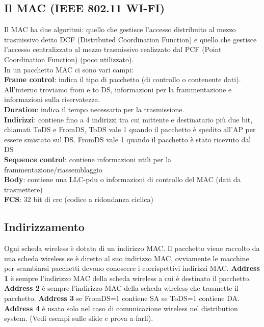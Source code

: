 \documentclass{article}
\begin{document}
\subsection{Il MAC (IEEE 802.11 WI-FI)}
Il MAC ha due algoritmi: quello che gestisce l’accesso distribuito al mezzo trasmissivo detto DCF (Distributed Coordination Function) e quello che gestisce l’accesso centralizzato al mezzo trasmissivo realizzato dal PCF (Point Coordination Function) (poco utilizzato).\\
In un pacchetto MAC ci sono vari campi:\\
\textbf{Frame control}: indica il tipo di pacchetto (di controllo o contenente dati). All'interno troviamo from e to DS, informazioni per la frammentazione e informazioni sulla riservatezza.\\
\textbf{Duration}: indica il tempo necessario per la trasmissione.\\
\textbf{Indirizzi}: contiene fino a 4 indirizzi tra cui mittente e destinatario più due bit, chiamati ToDS e FromDS, ToDS vale 1 quando il pacchetto è spedito all’AP per essere smistato sul DS. FromDS vale 1 quando il pacchetto è stato ricevuto dal DS\\
\textbf{Sequence control}: contiene informazioni utili per la frammentazione/riassemblaggio\\
\textbf{Body}: contiene una LLC-pdu o informazioni di controllo del MAC (dati da trasmettere)\\
\textbf{FCS}: 32 bit di crc (codice a ridondanza ciclica)
\subsection{Indirizzamento}
Ogni scheda wireless è dotata di un indirizzo MAC. Il pacchetto viene raccolto da una scheda wireless se è diretto al suo indirizzo MAC, ovviamente le macchine per scambiarsi pacchetti devono conoscere i corrispettivi indirizzi MAC. \textbf{Address 1} è sempre l’indirizzo MAC della scheda wireless a cui è destinato il pacchetto. \textbf{Address 2} è sempre l’indirizzo MAC della scheda wireless che trasmette il pacchetto. \textbf{Address 3} se FromDS=1 contiene SA se ToDS=1 contiene DA. \textbf{Address 4} è usato solo nel caso di comunicazione wireless nel distribution system. (Vedi esempi sulle slide e prova a farli).
\end{document}
